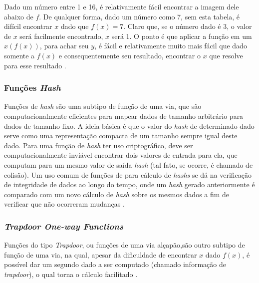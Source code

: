 \documentclass[
	article,			%
	11pt,				%
	oneside,			%
	a4paper,			%
	chapter=TITLE,		%
	section=TITLE,		%
	subsection=TITLE,	%
	subsubsection=TITLE, %
	english,			%
	brazil,				%
	sumario=tradicional
	]{ifrs-artigo-abntex2}
\begin{document}
Dado um número entre 1 e 16, é relativamente fácil encontrar a imagem dele abaixo de $f$. De qualquer forma, dado um número como 7, sem esta tabela, é difícil encontrar $x$ dado que $f(x) = 7$. Claro que, se o número dado é 3, o valor de $x$ será facilmente encontrado, $x$ será 1. O ponto é que aplicar a função em um $x (f(x))$, para achar seu $y$, é fácil e relativamente muito mais fácil que dado somente a $f(x)$ e consequentemente seu resultado, encontrar o $x$ que resolve para esse resultado \cite{katz1996handbook}.

\subsubsection{Funções \textit{Hash}}
Funções de \textit{hash} são uma subtipo de função de uma via, que são computacionalmente eficientes para mapear dados de tamanho arbitrário para dados de tamanho fixo. A ideia básica é que o valor do \textit{hash} de determinado dado serve como uma representação compacta de um tamanho sempre igual deste dado. Para uma função de \textit{hash} ter uso criptográfico, deve ser computacionalmente inviável encontrar dois valores de entrada para ela, que computam para um mesmo valor de saída \textit{hash} (tal fato, se ocorre, é chamado de colisão). Um uso comum de funções de para cálculo de \textit{hashs} se dá na verificação de integridade de dados ao longo do tempo, onde um \textit{hash} gerado anteriormente é comparado com um novo cálculo de \textit{hash} sobre os mesmos dados a fim de verificar que não ocorreram mudanças \cite{katz1996handbook}.

\subsubsection{\textit{Trapdoor One-way Functions}}
Funções do tipo \textit{Trapdoor}, ou funções de uma via alçapão,são outro subtipo de função de uma via, na qual, apesar da dificuldade de encontrar $x$ dado $f(x)$, é possível dar um segundo dado a ser computado (chamado informação de \textit{trapdoor}), o qual torna o cálculo facilitado \cite{katz1996handbook}.
\end{document}
